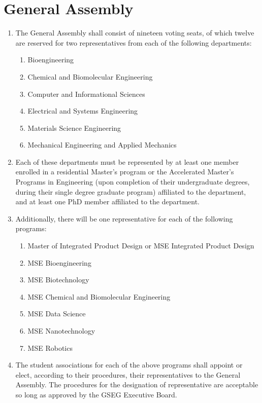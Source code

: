\chapter{General Assembly}
\label{art:assembly}

\begin{enumerate}[label=\Alph*.]

	\item The General Assembly shall consist of nineteen voting seats, of which twelve are reserved for two representatives from each of the following departments:
	\begin{enumerate}[label=(\roman*)]
		\item Bioengineering
		\item Chemical and Biomolecular Engineering
		\item Computer and Informational Sciences
		\item Electrical and Systems Engineering
		\item Materials Science Engineering
		\item Mechanical Engineering and Applied Mechanics
	\end{enumerate}

	\item Each of these departments must be represented by at least one member enrolled in a residential Master's program or the Accelerated Master’s Programs in Engineering (upon completion of their undergraduate degrees, during their single degree graduate program) affiliated to the department, and at least one PhD member affiliated to the department. 

	\item Additionally, there will be one representative for each of the following programs:
	\begin{enumerate}[label=(\roman*)]
		\item Master of Integrated Product Design or MSE Integrated Product Design
		\item MSE Bioengineering
		\item MSE Biotechnology
		\item MSE Chemical and Biomolecular Engineering
		\item MSE Data Science
		\item MSE Nanotechnology
		\item MSE Robotics
	\end{enumerate}

	\item The student associations for each of the above programs shall appoint or elect, according
	to their procedures, their representatives to the General Assembly. The procedures for the
	designation of representative are acceptable so long as approved by the GSEG Executive Board.


\end{enumerate}
